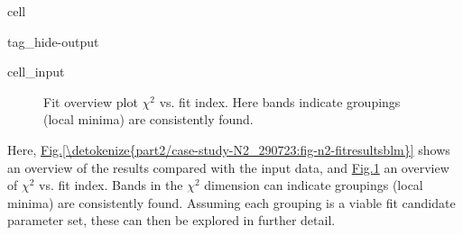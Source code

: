 \documentclass[letterpaper,table,10pt,english]{jupyterBook}
\begin{document}
\begin{sphinxuseclass}{cell}
\begin{sphinxuseclass}{tag_hide-output}\begin{sphinxVerbatimInput}

\begin{sphinxuseclass}{cell_input}
\begin{sphinxVerbatim}[commandchars=\\\{\}]


 

\PYG{p}{[}\PYG{p}{]}\PYG{p}{[}\PYG{p}{]}
\end{sphinxVerbatim}

\end{sphinxuseclass}\end{sphinxVerbatimInput}

\end{sphinxuseclass}
\end{sphinxuseclass}
\begin{figure}[htbp]
\centering
\capstart

\noindent{}
\caption{Fit overview plot \sphinxhyphen{} \(\chi^2\) vs. fit index. Here bands indicate groupings (local minima) are consistently found.}\label{\detokenize{part2/case-study-N2_290723:fig-n2-fithist}}\end{figure}

\sphinxAtStartPar
Here, \hyperref[\detokenize{part2/case-study-N2_290723:fig-n2-fitresultsblm}]{Fig.\@ \ref{\detokenize{part2/case-study-N2_290723:fig-n2-fitresultsblm}}} shows an overview of the results compared with the input data, and \hyperref[\detokenize{part2/case-study-N2_290723:fig-n2-fithist}]{Fig.\@ \ref{\detokenize{part2/case-study-N2_290723:fig-n2-fithist}}} an overview of \(\chi^2\) vs. fit index. Bands in the \(\chi^2\) dimension can indicate groupings (local minima) are consistently found. Assuming each grouping is a viable fit candidate parameter set, these can then be explored in further detail.
\end{document}
